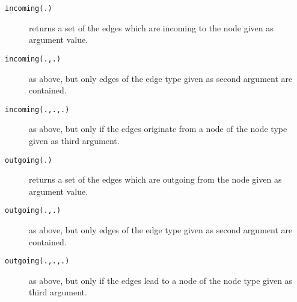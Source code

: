 \begin{description}
\item[\texttt{incoming(.)}] returns a set of the edges which are incoming to the node given as argument value.
\item[\texttt{incoming(.,.)}] as above, but only edges of the edge type given as second argument are contained.
\item[\texttt{incoming(.,.,.)}] as above, but only if the edges originate from a node of the node type given as third argument.
\item[\texttt{outgoing(.)}] returns a set of the edges which are outgoing from the node given as argument value.
\item[\texttt{outgoing(.,.)}] as above, but only edges of the edge type given as second argument are contained.
\item[\texttt{outgoing(.,.,.)}] as above, but only if the edges lead to a node of the node type given as third argument.
\end{description}

